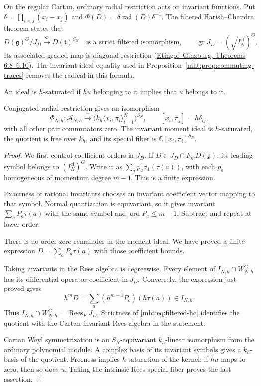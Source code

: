 On the regular Cartan, ordinary radial restriction acts on
invariant functions. Put
$\delta=\prod_{i<j}(x_i-x_j)$ and
$\Phi(D)=\delta\operatorname{rad}(D)\delta^{-1}$.
The filtered Harish--Chandra theorem states that
\begin{equation}\label{mht:eq:filtered-hc}
 D(\mathfrak g)^G/J_D\xrightarrow{\ \Phi\ }D(\mathfrak t)^{S_N}
 \quad\text{is a strict filtered isomorphism},\qquad
 \operatorname{gr}J_D=(\sqrt{I_N^{\mathrm{cl}}})^G.
\end{equation}
Its associated graded map is diagonal restriction
(\href{https://arxiv.org/abs/math/0011114}
{Etingof--Ginzburg, Theorems 6.8--6.10}).
The invariant-ideal equality used in
Proposition~\ref{mht:prop:commuting-traces} removes the radical
in this formula.

An ideal is $h$-saturated if $hu$ belonging to it implies
that $u$ belongs to it.

\begin{theorem}\label{mht:thm:integral-matrix-reduction}
Conjugated radial restriction gives an isomorphism
\[
 \Phi_{N,h}:\mathcal A_{N,h}
 \xrightarrow{\ \sim\ }
 \bigl(k_h\langle x_i,\pi_i\rangle_{i=1}^N\bigr)^{S_N},
 \qquad [x_i,\pi_j]=h\delta_{ij},
\]
with all other pair commutators zero. The invariant moment ideal
is $h$-saturated, the quotient is free over $k_h$, and its special
fiber is $\mathbb C[x_i,\pi_i]^{S_N}$.
\end{theorem}
\begin{proof}
We first control coefficient orders in $J_D$. If
$D\in J_D\cap F_mD(\mathfrak g)$, its leading symbol belongs to
$(I_N^{\mathrm{cl}})^G$. Write it as
$\sum_a p_a\sigma_1(\tau(a))$, with each $p_a$ homogeneous of
momentum degree $m-1$. This is a finite expression.

Exactness
of rational invariants chooses an invariant coefficient vector
mapping to that symbol. Normal quantization is equivariant,
so it gives invariant $\sum_aP_a\tau(a)$ with the same symbol
and $\operatorname{ord}P_a\leq m-1$. Subtract and repeat at
lower order.

There is no order-zero remainder in the moment
ideal. We have proved a finite expression
$D=\sum_aP_a\tau(a)$ with those coefficient bounds.

Taking invariants in the Rees algebra is degreewise. Every
element of $I_{N,h}\cap W_{N,h}^G$ has its differential-operator
coefficient in $J_D$. Conversely, the expression just proved gives
\[
 h^mD=\sum_a(h^{m-1}P_a)(h\tau(a))\in I_{N,h}.
\]
Thus $I_{N,h}\cap W_{N,h}^G=\operatorname{Rees}_FJ_D$.
Strictness of \eqref{mht:eq:filtered-hc} identifies the quotient
with the Cartan invariant Rees algebra in the statement.

Cartan Weyl symmetrization is an $S_N$-equivariant $k_h$-linear
isomorphism from the ordinary polynomial module. A complex
basis of its invariant symbols gives a $k_h$-basis of the
quotient. Freeness implies $h$-saturation of the kernel:
if $hu$ maps to zero, then so does $u$.
Taking the intrinsic Rees special fiber proves the last assertion.
\end{proof}

